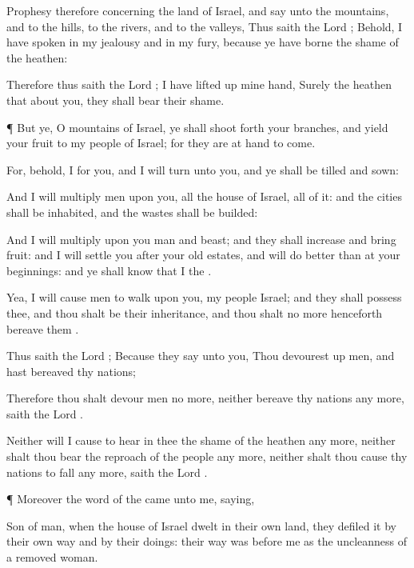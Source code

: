 {Prophesy therefore concerning the
land of
Israel, and
say unto the
mountains, and to the
hills, to the
rivers, and to the
valleys, Thus
saith the
Lord
{}; Behold, I have
spoken in my
jealousy and in my
fury, because ye have
borne the
shame of the
heathen:

Therefore thus
saith the
Lord
{}; I have lifted
up mine
hand, Surely the
heathen that
{}
about you, they shall
bear their
shame.


\par }{\PP {}¶ But ye, O
mountains of
Israel, ye shall shoot
forth your
branches, and
yield your
fruit to my
people of
Israel; for they are at
hand to
come.

For, behold, I
{} for you, and I will
turn unto you, and ye shall be
tilled and
sown:

And I will
multiply
men upon you, all the
house of
Israel,
{} all of it: and the
cities shall be
inhabited, and the
wastes shall be
builded:

And I will
multiply upon you
man and
beast; and they shall
increase and bring
fruit: and I will
settle you after your old
estates, and will do
better
{} than at your
beginnings: and ye shall
know that I
{} the
{}.

Yea, I will cause
men to
walk upon you,
{} my
people
Israel; and they shall
possess thee, and thou shalt be their
inheritance, and thou shalt no
more henceforth
bereave them
{}.

Thus
saith the
Lord
{}; Because they
say unto you, Thou
{} devourest
up
men, and hast
bereaved thy
nations;

Therefore thou shalt
devour
men no more, neither
bereave thy
nations any more,
saith the
Lord
{}.

Neither will I cause
{} to
hear in thee the
shame of the
heathen any more, neither shalt thou
bear the
reproach of the
people any more, neither shalt thou cause thy
nations to
fall any more,
saith the
Lord
{}.


\par }{\PP {}¶ Moreover the
word of the
{} came unto me,
saying,

Son of
man, when the
house of
Israel
dwelt in their own
land, they
defiled it by their own
way and by their
doings: their
way was
before me as the
uncleanness of a removed
woman.

}
